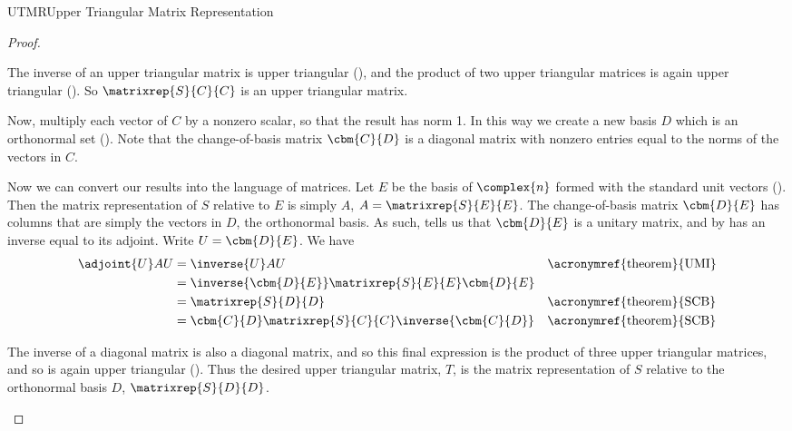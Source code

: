 \begin{subsect}{UTMR}{Upper Triangular Matrix Representation}
\begin{proof}
\begin{para}
%
The inverse of an upper triangular matrix is upper triangular (), and the product of two upper triangular matrices is again upper triangular ().  So $\matrixrep{S}{C}{C}$ is an upper triangular matrix.\end{para}
%
\begin{para}Now, multiply each vector of $C$ by a nonzero scalar, so that the result has norm 1.  In this way we create a new basis $D$ which is an orthonormal set ().  Note that the change-of-basis matrix $\cbm{C}{D}$ is a diagonal matrix with nonzero entries equal to the norms of the vectors in $C$.\end{para}
%
\begin{para}Now we can convert our results into the language of matrices.  Let $E$ be the basis of $\complex{n}$ formed with the standard unit vectors ().  Then the matrix representation of $S$ relative to $E$ is simply $A$, $A=\matrixrep{S}{E}{E}$.  The change-of-basis matrix $\cbm{D}{E}$ has columns that are simply the vectors in $D$, the orthonormal basis.  As such,  tells us that $\cbm{D}{E}$ is a unitary matrix, and by  has an inverse equal to its adjoint.  Write $U=\cbm{D}{E}$.  We have
%
\begin{align*}
\adjoint{U}AU
&=\inverse{U}AU&&\text{\acronymref{theorem}{UMI}}\\
&=\inverse{\cbm{D}{E}}\matrixrep{S}{E}{E}\cbm{D}{E}\\
&=\matrixrep{S}{D}{D}&&\text{\acronymref{theorem}{SCB}}\\
&=\cbm{C}{D}\matrixrep{S}{C}{C}\inverse{\cbm{C}{D}}&&\text{\acronymref{theorem}{SCB}}
\end{align*}
\end{para}
%
\begin{para}The inverse of a diagonal matrix is also a diagonal matrix, and so this final expression is the product of three upper triangular matrices, and so is again upper triangular ().  Thus the desired upper triangular matrix, $T$, is the matrix representation of $S$ relative to the orthonormal basis $D$, $\matrixrep{S}{D}{D}$.\end{para}
%
\end{proof}
%
\end{subsect}
%
